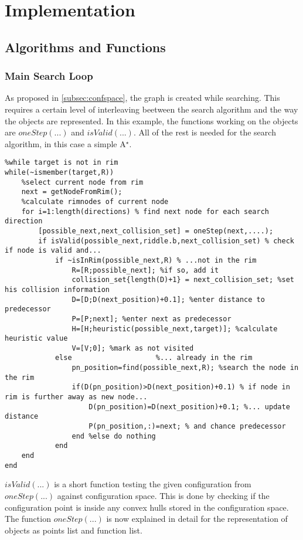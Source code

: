 \chapter{Implementation}
\label{cha:Implementation}

\section{Algorithms and Functions}
\subsection{Main Search Loop}
As proposed in \ref{subsec:confspace}, the graph is created while searching. This requires a certain level of interleaving beetween the search algorithm and the way the objects are represented. In this example, the functions working on the objects are $oneStep(...)$ and $isValid(...)$. All of the rest is needed for the search algorithm, in this case a simple A$^\star$.

\begin{lstlisting}
%while target is not in rim
while(~ismember(target,R))
    %select current node from rim
    next = getNodeFromRim();  
    %calculate rimnodes of current node 
    for i=1:length(directions) % find next node for each search direction
        [possible_next,next_collision_set] = oneStep(next,....); 
        if isValid(possible_next,riddle.b,next_collision_set) % check if node is valid and...
            if ~isInRim(possible_next,R) % ...not in the rim
                R=[R;possible_next]; %if so, add it
                collision_set{length(D)+1} = next_collision_set; %set his collision information
                D=[D;D(next_position)+0.1]; %enter distance to predecessor
                P=[P;next]; %enter next as predecessor
                H=[H;heuristic(possible_next,target)]; %calculate heuristic value
                V=[V;0]; %mark as not visited
            else                    %... already in the rim
                pn_position=find(possible_next,R); %search the node in the rim
                if(D(pn_position)>D(next_position)+0.1) % if node in rim is further away as new node...
                    D(pn_position)=D(next_position)+0.1; %... update distance
                    P(pn_position,:)=next; % and chance predecessor
                end %else do nothing
            end
    end  
end
\end{lstlisting}

$isValid(...)$ is a short function testing the given configuration from $oneStep(...)$ against configuration space. This is done by checking if the configuration point is inside any convex hulls stored in the configuration space.\\
The function $oneStep(...)$ is now explained in detail for the representation of objects as points list and function list.

